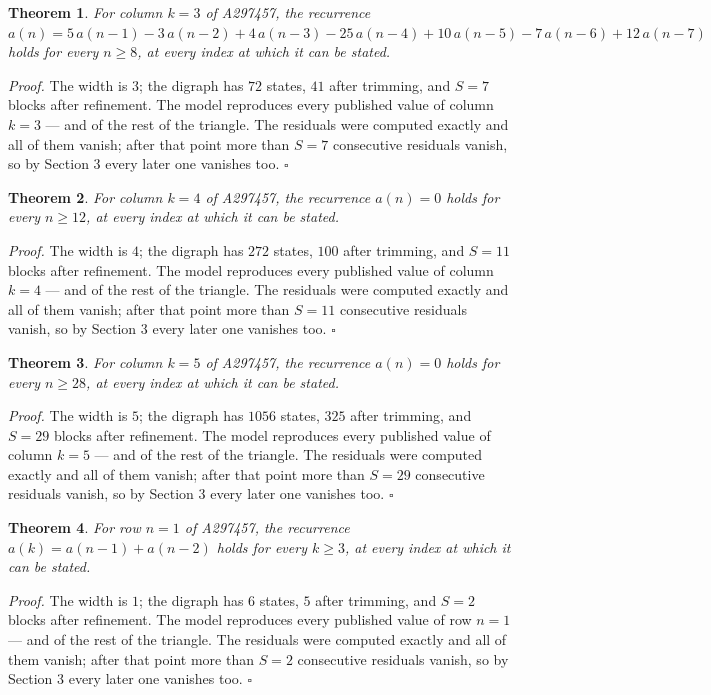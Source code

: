 \documentclass[11pt]{article}
\newtheorem{theorem}{Theorem}
\theoremstyle{definition}
\begin{document}
\begin{theorem} For column $k = 3$ of A297457, the recurrence $a(n) = 5\,a(n-1) - 3\,a(n-2) + 4\,a(n-3) - 25\,a(n-4) + 10\,a(n-5) - 7\,a(n-6) + 12\,a(n-7)$ holds for every $n \ge 8$, at every index at which it can be stated.\end{theorem}

{\itshape Proof.} The width is $3$; the digraph has $72$ states, $41$ after trimming, and $S = 7$ blocks after refinement. The model reproduces every published value of column $k = 3$ --- and of the rest of the triangle. The residuals were computed exactly and all of them vanish; after that point more than $S = 7$ consecutive residuals vanish, so by Section 3 every later one vanishes too. $\square$

\begin{theorem} For column $k = 4$ of A297457, the recurrence $a(n) = 0$ holds for every $n \ge 12$, at every index at which it can be stated.\end{theorem}

{\itshape Proof.} The width is $4$; the digraph has $272$ states, $100$ after trimming, and $S = 11$ blocks after refinement. The model reproduces every published value of column $k = 4$ --- and of the rest of the triangle. The residuals were computed exactly and all of them vanish; after that point more than $S = 11$ consecutive residuals vanish, so by Section 3 every later one vanishes too. $\square$

\begin{theorem} For column $k = 5$ of A297457, the recurrence $a(n) = 0$ holds for every $n \ge 28$, at every index at which it can be stated.\end{theorem}

{\itshape Proof.} The width is $5$; the digraph has $1056$ states, $325$ after trimming, and $S = 29$ blocks after refinement. The model reproduces every published value of column $k = 5$ --- and of the rest of the triangle. The residuals were computed exactly and all of them vanish; after that point more than $S = 29$ consecutive residuals vanish, so by Section 3 every later one vanishes too. $\square$

\begin{theorem} For row $n = 1$ of A297457, the recurrence $a(k) = a(n-1) + a(n-2)$ holds for every $k \ge 3$, at every index at which it can be stated.\end{theorem}

{\itshape Proof.} The width is $1$; the digraph has $6$ states, $5$ after trimming, and $S = 2$ blocks after refinement. The model reproduces every published value of row $n = 1$ --- and of the rest of the triangle. The residuals were computed exactly and all of them vanish; after that point more than $S = 2$ consecutive residuals vanish, so by Section 3 every later one vanishes too. $\square$
\end{document}
